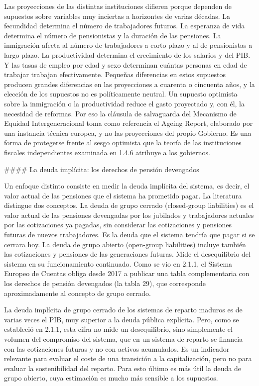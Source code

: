 \documentclass[10pt,a4paper]{article}
\begin{document}
Las proyecciones de las distintas instituciones difieren porque dependen de supuestos sobre variables muy inciertas a horizontes de varias décadas. La fecundidad determina el número de trabajadores futuros. La esperanza de vida determina el número de pensionistas y la duración de las pensiones. La inmigración afecta al número de trabajadores a corto plazo y al de pensionistas a largo plazo. La productividad determina el crecimiento de los salarios y del PIB. Y las tasas de empleo por edad y sexo determinan cuántas personas en edad de trabajar trabajan efectivamente. Pequeñas diferencias en estos supuestos producen grandes diferencias en las proyecciones a cuarenta o cincuenta años, y la elección de los supuestos no es políticamente neutral. Un supuesto optimista sobre la inmigración o la productividad reduce el gasto proyectado y, con él, la necesidad de reformas. Por eso la cláusula de salvaguarda del Mecanismo de Equidad Intergeneracional toma como referencia el Ageing Report, elaborado por una instancia técnica europea, y no las proyecciones del propio Gobierno. Es una forma de protegerse frente al sesgo optimista que la teoría de las instituciones fiscales independientes examinada en 1.4.6 atribuye a los gobiernos.

#### La deuda implícita: los derechos de pensión devengados

Un enfoque distinto consiste en medir la deuda implícita del sistema, es decir, el valor actual de las pensiones que el sistema ha prometido pagar. La literatura distingue dos conceptos. La deuda de grupo cerrado (closed-group liabilities) es el valor actual de las pensiones devengadas por los jubilados y trabajadores actuales por las cotizaciones ya pagadas, sin considerar las cotizaciones y pensiones futuras de nuevos trabajadores. Es la deuda que el sistema tendría que pagar si se cerrara hoy. La deuda de grupo abierto (open-group liabilities) incluye también las cotizaciones y pensiones de las generaciones futuras. Mide el desequilibrio del sistema en su funcionamiento continuado. Como se vio en 2.1.1, el Sistema Europeo de Cuentas obliga desde 2017 a publicar una tabla complementaria con los derechos de pensión devengados (la tabla 29), que corresponde aproximadamente al concepto de grupo cerrado.

La deuda implícita de grupo cerrado de los sistemas de reparto maduros es de varias veces el PIB, muy superior a la deuda pública explícita. Pero, como se estableció en 2.1.1, esta cifra no mide un desequilibrio, sino simplemente el volumen del compromiso del sistema, que en un sistema de reparto se financia con las cotizaciones futuras y no con activos acumulados. Es un indicador relevante para evaluar el coste de una transición a la capitalización, pero no para evaluar la sostenibilidad del reparto. Para esto último es más útil la deuda de grupo abierto, cuya estimación es mucho más sensible a los supuestos.
\end{document}

